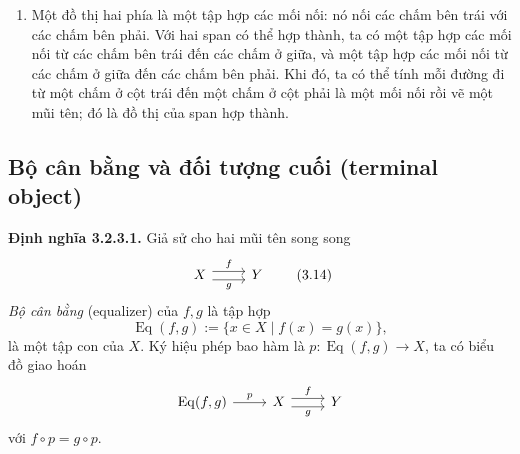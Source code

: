 \begin{enumerate}[label=\alph*.]
Span hợp thành là
\begin{center}\end{center}
\item Một đồ thị hai phía là một tập hợp các mối nối: nó nối các chấm bên trái với các chấm bên phải. Với hai span có thể hợp thành, ta có một tập hợp các mối nối từ các chấm bên trái đến các chấm ở giữa, và một tập hợp các mối nối từ các chấm ở giữa đến các chấm bên phải. Khi đó, ta có thể tính mỗi đường đi từ một chấm ở cột trái đến một chấm ở cột phải là một mối nối rồi vẽ một mũi tên; đó là đồ thị của span hợp thành.
\end{enumerate}

\subsection{Bộ cân bằng và đối tượng cuối (terminal object)}
\noindent\textbf{Định nghĩa 3.2.3.1.} Giả sử cho hai mũi tên song song
\begin{equation*}\begin{tikzcd}X\arrow[r,shift left=.7ex,"f"]\arrow[r,shift right=.7ex,"g"']&Y\end{tikzcd}\tag{3.14}\end{equation*}
\emph{Bộ cân bằng} (equalizer) của $f,g$ là tập hợp
\[\operatorname{Eq}(f,g):=\{x\in X\mid f(x)=g(x)\},\]
là một tập con của $X$. Ký hiệu phép bao hàm là $p:\operatorname{Eq}(f,g)\to X$, ta có biểu đồ giao hoán
\[\begin{tikzcd}\operatorname{Eq}(f,g)\arrow[r,"p"]&X\arrow[r,shift left=.7ex,"f"]\arrow[r,shift right=.7ex,"g"']&Y\end{tikzcd}\]
với $f\circ p=g\circ p$.

